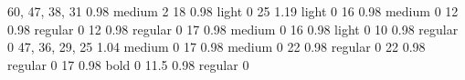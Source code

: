        {60, 47, 38, 31}  {0.98}  {medium}   {2}
        {18}              {0.98}  {light}    {0}
 {25}              {1.19}  {light}    {0}
     {16}              {0.98}  {medium}   {0}
  {12}              {0.98}  {regular}  {0}
     {12}              {0.98}  {regular}  {0}
       {17}              {0.98}  {medium}   {0}
      {16}              {0.98}  {light}    {0}
        {10}              {0.98}  {regular}  {0}
       {47, 36, 29, 25}  {1.04}  {medium}   {0}
       {17}              {0.98}  {medium}   {0}
        {22}              {0.98}  {regular}  {0}
      {22}              {0.98}  {regular}  {0}
     {17}              {0.98}  {bold}     {0}
 {11.5}            {0.98}  {regular}  {0}

\newif\ifunibscompendium   %
\newlength\unibsX \setlength\unibsX{17.5mm}

